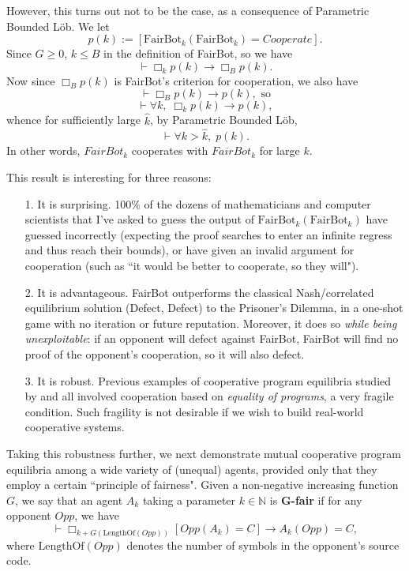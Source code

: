 \documentclass[onecolumn]{miri-tech-article}
\numberwithin{equation}{section}
\theoremstyle{definition}
\newcommand{\NN}{\mathbb{N}}
\newcommand{\proves}[1]{\underset{#1}{\vdash}}
\newcommand{\bx}[1]{\Box_{#1}}
\renewcommand{\implies}{\rightarrow}
\renewcommand{\-}{^{-1}}
\newcommand{\FB}{\mathrm{FairBot}}
\begin{document}
However, this turns out not to be the case, as a consequence of Parametric Bounded L\"{o}b.  We let $$p(k) := [\FB_k(\FB_k) = Cooperate].$$
Since $G\geq 0$, $k \leq B$ in the definition of FairBot, so we have 
$$\proves{} \bx{k}p(k) \implies \bx{B}p(k).$$
Now since $\bx{B}p(k)$ is FairBot's criterion for cooperation, we also have 
$$\proves{} \bx{B}p(k) \implies p(k), \textrm{ \ so}$$ 
$$\proves{} \forall k, \; \bx{k} p(k) \implies p(k),$$
whence for sufficiently large $\hat k$, by Parametric Bounded L\"{o}b,
$$\proves{} \forall k>\hat k,\; p(k).$$
In other words, $FairBot_k$ cooperates with $FairBot_k$ for large $k$.  

This result is interesting for three reasons:

\begin{itemize}
\item[1.]  It is surprising.  100\% of the dozens of mathematicians and computer scientists that I've asked to guess the output of $\FB_k(\FB_k)$ have guessed incorrectly (expecting the proof searches to enter an infinite regress and thus reach their bounds), or have given an invalid argument for cooperation (such as ``it would be better to cooperate, so they will").
\item[2.] It is advantageous. FairBot outperforms the classical Nash/correlated equilibrium solution (Defect, Defect) to the Prisoner's Dilemma, in a one-shot game with no iteration or future reputation.  Moreover, it does so {\em while being unexploitable}: if an opponent will defect against FairBot, FairBot will find no proof of the opponent's cooperation, so it will also defect.  
\item[3.] It is robust.  Previous examples of cooperative program equilibria studied by \cite{Tennenholtz:2004:Program} and \cite{Fortnow:2009:Program} all involved cooperation based on {\em equality of programs}, a very fragile condition.  Such fragility is not desirable if we wish to build real-world cooperative systems.  
\end{itemize}

Taking this robustness further, we next demonstrate mutual cooperative program equilibria among a wide variety of (unequal) agents, provided only that they employ a certain ``principle of fairness".  Given a non-negative increasing function $G$, we say that an agent $A_k$ taking a parameter $k \in \NN$ is {\bf G-fair} if for any opponent $Opp$, we have
$$\proves{} \bx{k+G(\textrm{LengthOf}(Opp))}[Opp(A_k) = C] \implies A_k(Opp) = C,$$
where $\textrm{LengthOf}(Opp)$ denotes the number of symbols in the opponent's source code.
\end{document}
